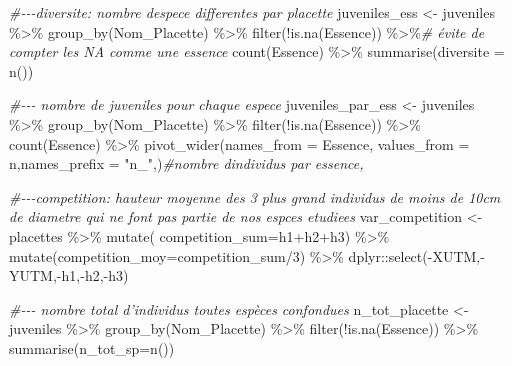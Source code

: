 \documentclass[
  12pt,
  american,
  a4paper,
  extrafontsizes,onecolumn,openright
  ]{memoir}
\newenvironment{Shaded}{\begin{snugshade}}{\end{snugshade}}
\newcommand{\AttributeTok}[1]{\textcolor[rgb]{0.77,0.63,0.00}{#1}}
\newcommand{\CommentTok}[1]{\textcolor[rgb]{0.56,0.35,0.01}{\textit{#1}}}
\newcommand{\DecValTok}[1]{\textcolor[rgb]{0.00,0.00,0.81}{#1}}
\newcommand{\FunctionTok}[1]{\textcolor[rgb]{0.00,0.00,0.00}{#1}}
\newcommand{\NormalTok}[1]{#1}
\newcommand{\OtherTok}[1]{\textcolor[rgb]{0.56,0.35,0.01}{#1}}
\newcommand{\SpecialCharTok}[1]{\textcolor[rgb]{0.00,0.00,0.00}{#1}}
\newcommand{\StringTok}[1]{\textcolor[rgb]{0.31,0.60,0.02}{#1}}
\begin{document}
\begin{Shaded}
\begin{Highlighting}[]
\CommentTok{\#{-}{-}{-}diversite: nombre d\textquotesingle{}espece differentes par placette}
\NormalTok{juveniles\_ess }\OtherTok{\textless{}{-}}\NormalTok{ juveniles }\SpecialCharTok{\%\textgreater{}\%} 
  \FunctionTok{group\_by}\NormalTok{(Nom\_Placette) }\SpecialCharTok{\%\textgreater{}\%}
  \FunctionTok{filter}\NormalTok{(}\SpecialCharTok{!}\FunctionTok{is.na}\NormalTok{(Essence)) }\SpecialCharTok{\%\textgreater{}\%}\CommentTok{\# évite de compter les NA comme une essence }
  \FunctionTok{count}\NormalTok{(Essence) }\SpecialCharTok{\%\textgreater{}\%} 
  \FunctionTok{summarise}\NormalTok{(}\AttributeTok{diversite =} \FunctionTok{n}\NormalTok{())}

\CommentTok{\#{-}{-}{-}  nombre de juveniles pour chaque espece}
\NormalTok{juveniles\_par\_ess }\OtherTok{\textless{}{-}}\NormalTok{ juveniles }\SpecialCharTok{\%\textgreater{}\%} 
  \FunctionTok{group\_by}\NormalTok{(Nom\_Placette) }\SpecialCharTok{\%\textgreater{}\%} 
  \FunctionTok{filter}\NormalTok{(}\SpecialCharTok{!}\FunctionTok{is.na}\NormalTok{(Essence)) }\SpecialCharTok{\%\textgreater{}\%}
  \FunctionTok{count}\NormalTok{(Essence) }\SpecialCharTok{\%\textgreater{}\%} 
  \FunctionTok{pivot\_wider}\NormalTok{(}\AttributeTok{names\_from =}\NormalTok{ Essence, }\AttributeTok{values\_from =}\NormalTok{ n,}\AttributeTok{names\_prefix =} \StringTok{"n\_"}\NormalTok{,)}\CommentTok{\#nombre d\textquotesingle{}individus par essence,}

\CommentTok{\#{-}{-}{-}competition: hauteur moyenne des 3 plus grand individus de moins de 10cm de diametre qui ne font pas partie de nos espces etudiees}
\NormalTok{var\_competition }\OtherTok{\textless{}{-}}\NormalTok{ placettes }\SpecialCharTok{\%\textgreater{}\%} 
  \FunctionTok{mutate}\NormalTok{( }\AttributeTok{competition\_sum=}\NormalTok{h1}\SpecialCharTok{+}\NormalTok{h2}\SpecialCharTok{+}\NormalTok{h3) }\SpecialCharTok{\%\textgreater{}\%}
  \FunctionTok{mutate}\NormalTok{(}\AttributeTok{competition\_moy=}\NormalTok{competition\_sum}\SpecialCharTok{/}\DecValTok{3}\NormalTok{) }\SpecialCharTok{\%\textgreater{}\%}  
\NormalTok{  dplyr}\SpecialCharTok{::}\FunctionTok{select}\NormalTok{(}\SpecialCharTok{{-}}\NormalTok{XUTM,}\SpecialCharTok{{-}}\NormalTok{YUTM,}\SpecialCharTok{{-}}\NormalTok{h1,}\SpecialCharTok{{-}}\NormalTok{h2,}\SpecialCharTok{{-}}\NormalTok{h3)}

\CommentTok{\#{-}{-}{-} nombre total d’individus toutes espèces confondues}
\NormalTok{n\_tot\_placette }\OtherTok{\textless{}{-}}\NormalTok{ juveniles }\SpecialCharTok{\%\textgreater{}\%} 
  \FunctionTok{group\_by}\NormalTok{(Nom\_Placette) }\SpecialCharTok{\%\textgreater{}\%} 
  \FunctionTok{filter}\NormalTok{(}\SpecialCharTok{!}\FunctionTok{is.na}\NormalTok{(Essence)) }\SpecialCharTok{\%\textgreater{}\%}  
  \FunctionTok{summarise}\NormalTok{(}\AttributeTok{n\_tot\_sp=}\FunctionTok{n}\NormalTok{())  }
 

\end{Highlighting}
\end{Shaded}
\end{document}
